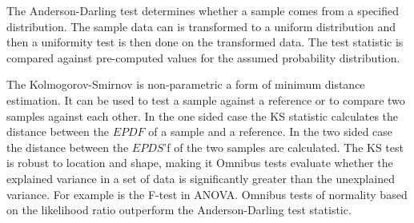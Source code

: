 The Anderson-Darling test determines whether a sample comes from a specified distribution. The sample data can is transformed to a uniform distribution and then a uniformity test is then done on the transformed data. The test statistic is compared against pre-computed values for the assumed probability distribution.

The Kolmogorov-Smirnov is non-parametric a form of minimum distance estimation.  It can be used to test a sample against a reference or to compare two samples against each other.  In the one sided case the KS statistic calculates the distance between the $EPDF$ of a sample and a reference.  In the two sided case the distance between the $EPDS$'f of the two samples are calculated.  The KS test is robust to location and shape, making it  Omnibus tests evaluate whether the explained variance in a set of data is significantly greater than the unexplained variance. For example is the F-test in ANOVA. Omnibus tests of normality based on the likelihood ratio outperform the Anderson-Darling test statistic.

